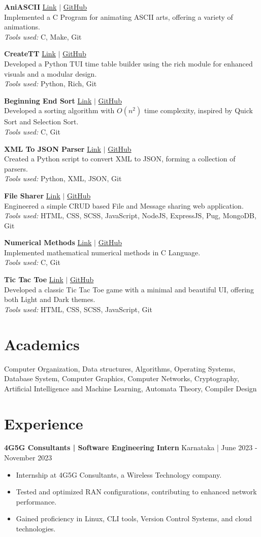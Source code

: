 \documentclass[a4paper,10pt]{article}
\newcommand{\projectentry}[5]{
  \noindent
  \textbf{#1} \hfill
  \href{#4}{Link} $|$ \href{#5}{GitHub} \\
  #2 \\
  \textit{Tools used:} #3
  \vspace{6pt} %
}
\begin{document}
\projectentry{AniASCII}{
  Implemented a C Program for animating ASCII arts, offering a variety of animations.
}{
  C, Make, Git
}{https://github.com/surajkareppagol/ANIASCII}{https://github.com/surajkareppagol/ANIASCII}

\projectentry{CreateTT}{
  Developed a Python TUI time table builder using the rich module for enhanced visuals and a modular design.
}{
  Python, Rich, Git
}{https://github.com/surajkareppagol/CreateTT}{https://github.com/surajkareppagol/CreateTT}

\projectentry{Beginning End Sort}{
  Developed a sorting algorithm with $O(n^2)$ time complexity, inspired by Quick Sort and Selection Sort.
}{
  C, Git
}{https://github.com/surajkareppagol/BESort}{https://github.com/surajkareppagol/BESort}

\projectentry{XML To JSON Parser}{
  Created a Python script to convert XML to JSON, forming a collection of parsers.
}{
  Python, XML, JSON, Git
}{https://github.com/surajkareppagol/Parser}{https://github.com/surajkareppagol/Parser}

\projectentry{File Sharer}{
  Engineered a simple CRUD based File and Message sharing web application.
}{
  HTML, CSS, SCSS, JavaScript, NodeJS, ExpressJS, Pug, MongoDB, Git
}{https://github.com/surajkareppagol/FileSharer}{https://github.com/surajkareppagol/FileSharer}

\projectentry{Numerical Methods}{
  Implemented mathematical numerical methods in C Language.
}{
  C, Git
}{https://github.com/surajkareppagol/Numerical-Methods}{https://github.com/surajkareppagol/Numerical-Methods}

\projectentry{Tic Tac Toe}{
  Developed a classic Tic Tac Toe game with a minimal and beautiful UI, offering both Light and Dark themes.
}{
  HTML, CSS, SCSS, JavaScript, Git
}{https://surajkareppagol.github.io/Tic-Tac-Toe/}{https://github.com/surajkareppagol/Tic-Tac-Toe}

\section*{Academics}
Computer Organization, Data structures, Algorithms, Operating Systems, Database System, Computer Graphics, Computer Networks, Cryptography, Artificial Intelligence and Machine Learning, Automata Theory, Compiler Design

\section*{Experience}
\noindent
\textbf{4G5G Consultants | Software Engineering Intern} \hfill Karnataka | June 2023 - November 2023
\begin{itemize}[left=0pt]
  \item Internship at 4G5G Consultants, a Wireless Technology company.
  \item Tested and optimized RAN configurations, contributing to enhanced network performance.
  \item Gained proficiency in Linux, CLI tools, Version Control Systems, and cloud technologies.
\end{itemize}
\end{document}
